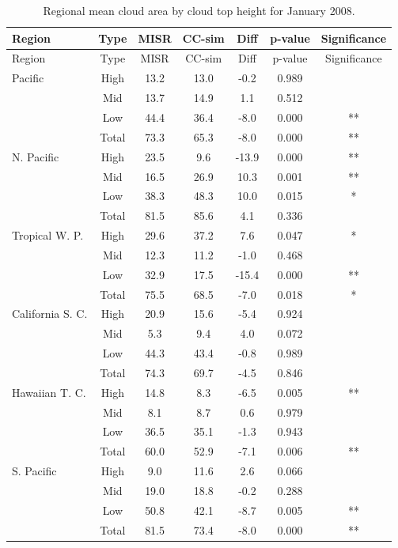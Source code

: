 \begin{longtable}[]{@{}lcccccc@{}}
\caption{\label{tbl:misr_cldmisr_table_january}Regional mean cloud area
by cloud top height for January 2008. }\tabularnewline
\toprule
Region & Type & MISR & CC-sim & Diff & p-value &
Significance\tabularnewline
\midrule
\endfirsthead
\toprule
Region & Type & MISR & CC-sim & Diff & p-value &
Significance\tabularnewline
\midrule
\endhead
Pacific & High & 13.2 & 13.0 & -0.2 & 0.989 &\tabularnewline
& Mid & 13.7 & 14.9 & 1.1 & 0.512 &\tabularnewline
& Low & 44.4 & 36.4 & -8.0 & 0.000 & **\tabularnewline
& Total & 73.3 & 65.3 & -8.0 & 0.000 & **\tabularnewline
N. Pacific & High & 23.5 & 9.6 & -13.9 & 0.000 & **\tabularnewline
& Mid & 16.5 & 26.9 & 10.3 & 0.001 & **\tabularnewline
& Low & 38.3 & 48.3 & 10.0 & 0.015 & *\tabularnewline
& Total & 81.5 & 85.6 & 4.1 & 0.336 &\tabularnewline
Tropical W. P. & High & 29.6 & 37.2 & 7.6 & 0.047 & *\tabularnewline
& Mid & 12.3 & 11.2 & -1.0 & 0.468 &\tabularnewline
& Low & 32.9 & 17.5 & -15.4 & 0.000 & **\tabularnewline
& Total & 75.5 & 68.5 & -7.0 & 0.018 & *\tabularnewline
California S. C. & High & 20.9 & 15.6 & -5.4 & 0.924 &\tabularnewline
& Mid & 5.3 & 9.4 & 4.0 & 0.072 &\tabularnewline
& Low & 44.3 & 43.4 & -0.8 & 0.989 &\tabularnewline
& Total & 74.3 & 69.7 & -4.5 & 0.846 &\tabularnewline
Hawaiian T. C. & High & 14.8 & 8.3 & -6.5 & 0.005 & **\tabularnewline
& Mid & 8.1 & 8.7 & 0.6 & 0.979 &\tabularnewline
& Low & 36.5 & 35.1 & -1.3 & 0.943 &\tabularnewline
& Total & 60.0 & 52.9 & -7.1 & 0.006 & **\tabularnewline
S. Pacific & High & 9.0 & 11.6 & 2.6 & 0.066 &\tabularnewline
& Mid & 19.0 & 18.8 & -0.2 & 0.288 &\tabularnewline
& Low & 50.8 & 42.1 & -8.7 & 0.005 & **\tabularnewline
& Total & 81.5 & 73.4 & -8.0 & 0.000 & **\tabularnewline
\bottomrule
\end{longtable}

